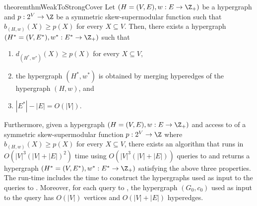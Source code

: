 \begin{restatable}{theorem}{thmWeakToStrongCover}\label{thm:WeakToStrongCover:main}
Let $(H=(V, E), w: E\rightarrow \Z_+)$ be a hypergraph and $p:2^V\rightarrow \Z$ be a symmetric skew-supermodular function such that 
$b_{(H, w)}(X) \geq p(X)$ for every $X \subseteq V$. 
Then, there exists a hypergraph \linebreak $\left(H^* = (V, E^*), w^*:E^* \rightarrow\Z_+\right)$ 
such that
\begin{enumerate}[label=$(\arabic*)$, ref=(\arabic*)]
    \item \label{thm:WeakToStrongCover:main:(1)} $d_{(H^*, w^*)}(X) \geq p(X)$ for every $X\subseteq V$,
    \item \label{thm:WeakToStrongCover:main:(2)} the hypergraph $(H^*,w^*)$ is obtained by merging hyperedges of the hypergraph $(H, w)$, and
    \item \label{thm:WeakToStrongCover:main:(3)} $|E^*| - |E| = O(|V|)$.
\end{enumerate}
Furthermore, given a hypergraph $(H=(V, E), w: E\rightarrow \Z_+)$ and access to  of a symmetric skew-supermodular function $p: 2^V\rightarrow \Z$ where $b_{(H, w)}(X)\ge p(X)$ for every $X\subseteq V$, there exists an algorithm that runs in $O(|V|^3(|V| + |E|)^2)$ time using $O(|V|^3(|V|+|E|))$ queries to  and returns a hypergraph $\left(H^* = (V, E^*), w^*:E^* \rightarrow\Z_+\right)$ satisfying the above three properties. The run-time includes the time to construct the hypergraphs used as input to the queries to .
Moreover, for each query to , the hypergraph $(G_0, c_0)$ used as input to the query has $O(|V|)$ vertices and $O(|V|+|E|)$ hyperedges.
\end{restatable}

